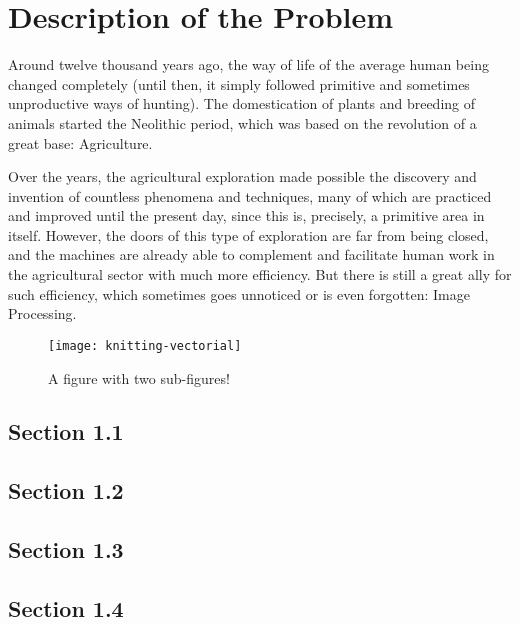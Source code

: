 

\chapter{Description of the Problem}\label{cha:introduction_description}

Around twelve thousand years ago, the way of life of the average human being changed completely (until then, it simply followed primitive and sometimes unproductive ways of hunting). %
The domestication of plants and breeding of animals started the Neolithic period, which was based on the revolution of a great base: Agriculture.

Over the years, the agricultural exploration made possible the discovery and invention of countless phenomena and techniques, many of which are practiced and improved until the present day, since this is, precisely, a primitive area in itself.
However, the doors of this type of exploration are far from being closed, and the machines are already able to complement and facilitate human work in the agricultural sector with much more efficiency. But there is still a great ally for such efficiency, which sometimes goes unnoticed or is even forgotten: Image Processing.




\begin{figure}[htbp]
  \centering
  \texttt{[image: knitting-vectorial]}%
  \caption{A figure with two sub-figures!}
  \label{fig:fig2subfig}
\end{figure}

\section{Section 1.1}\label{sub:sub1_1}

\section{Section 1.2}\label{sec:sub1_2}

\section{Section 1.3}\label{sec:sub1_3}

\section{Section 1.4}\label{sec:sub1_4}